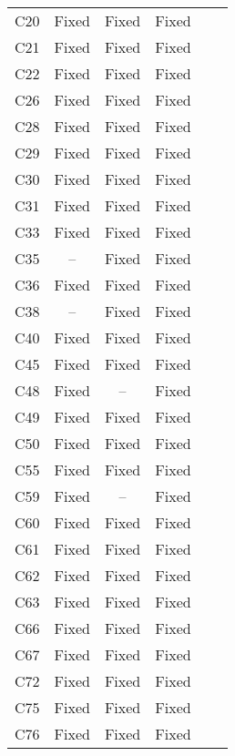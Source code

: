 \begin{table}[!t]
{\begin{tabular}{|c|c|c|c|c|c|}
C20               & Fixed     & Fixed     &Fixed   \\
C21               & Fixed     & Fixed     &Fixed   \\
C22               & Fixed     & Fixed     &Fixed   \\
C26               & Fixed     & Fixed     &Fixed   \\
C28               & Fixed     & Fixed     &Fixed   \\
C29               & Fixed     & Fixed     &Fixed   \\
C30               & Fixed     & Fixed     &Fixed   \\
C31               & Fixed     & Fixed     &Fixed   \\
C33               & Fixed     & Fixed     &Fixed   \\
C35               & --        & Fixed     &Fixed   \\
C36               & Fixed     & Fixed     &Fixed   \\
C38               & --        & Fixed     &Fixed   \\
C40               & Fixed     & Fixed     &Fixed   \\
C45               & Fixed     & Fixed     &Fixed   \\
C48               & Fixed     & --        &Fixed   \\
C49               & Fixed     & Fixed     &Fixed   \\
C50               & Fixed     & Fixed     &Fixed   \\
C55               & Fixed     & Fixed     &Fixed   \\
C59               & Fixed     & --        &Fixed   \\
C60               & Fixed     & Fixed     &Fixed   \\
C61               & Fixed     & Fixed     &Fixed   \\
C62               & Fixed     & Fixed     &Fixed   \\
C63               & Fixed     & Fixed     &Fixed   \\
C66               & Fixed     & Fixed     &Fixed   \\
C67               & Fixed     & Fixed     &Fixed   \\
C72               & Fixed     & Fixed     &Fixed   \\
C75               & Fixed     & Fixed     &Fixed   \\
C76               & Fixed     & Fixed     &Fixed   \\

\end{tabular}}
\end{table}

